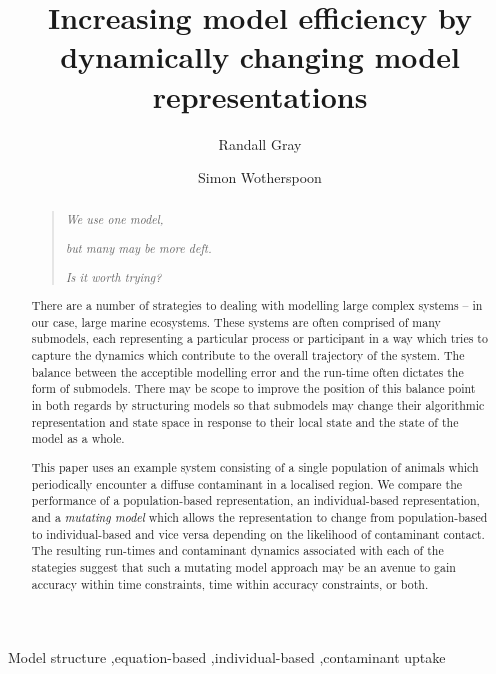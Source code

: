 \documentclass[preprint,authoryear,5p,twocolumn]{elsarticle}
\begin{document}
\begin{frontmatter}
\title{Increasing model efficiency by dynamically changing model representations}
\author{Randall Gray}
\address{CSIRO Division of Marine and Atmospheric Research}
\author{Simon Wotherspoon}
\address{University of Tasmania}
\begin{abstract}
  \begin{verse}
    {\em{We use one model,}}
    
    {\em{but many may be more deft.}}
    
    {\em{Is it worth trying?}}
  \end{verse}
  
  
  
  There are a number of strategies to dealing with modelling large complex systems -- in our case, large marine
  ecosystems. These systems are often comprised of many submodels, each representing a particular process or
  participant in a way which tries to capture the dynamics which contribute to the overall trajectory of the system.
  The balance between the acceptible modelling error and the run-time often dictates the form of submodels. There may
  be scope to improve the position of this balance point in both regards by structuring models so that submodels may
  change their algorithmic representation and state space in response to their local state and the state of the model
  as a whole.
  
  This paper uses an example system consisting of a single population of animals which periodically encounter a diffuse
  contaminant in a localised region. We compare the performance of a population-based representation, an
  individual-based representation, and a {\em{mutating model}} which allows the representation to change from
  population-based to individual-based and vice versa depending on the likelihood of contaminant contact. The resulting
  run-times and contaminant dynamics associated with each of the stategies suggest that such a mutating model approach
  may be an avenue to gain accuracy within time constraints, time within accuracy constraints, or both.
\end{abstract}
\begin{keyword}
Model structure \sep equation-based \sep individual-based
\sep contaminant uptake
\end{keyword}
\end{frontmatter}
\end{document}
